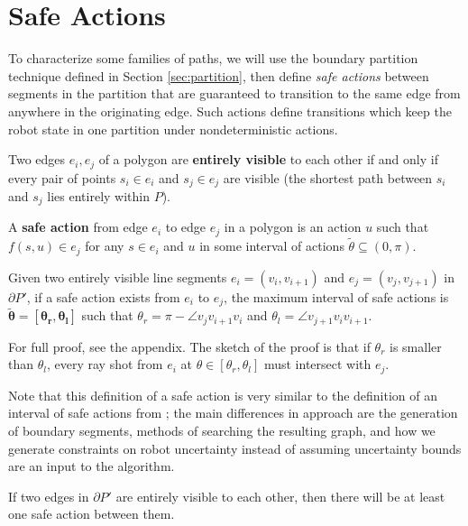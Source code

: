\documentclass[]{styles/svproc}  %
\begin{document}
\section{Safe Actions} \label{sec:safe}

To characterize some families of paths, we will use the boundary
partition technique defined in Section \ref{sec:partition}, then define
\emph{safe actions} between segments in the partition that are
guaranteed to transition to the same edge from anywhere in the
originating edge. Such actions define transitions which keep the
robot state in one partition under nondeterministic actions.

\begin{definition}
Two edges $e_i,e_j$ of a polygon are \textbf{entirely visible} to each other if
and only if every pair of points $s_i \in e_i$ and $s_j \in e_j$ are visible (the
shortest path between $s_i$ and $s_j$ lies entirely within $P$).
\end{definition}

\begin{definition} \label{def:sa}
A \textbf{safe action} from edge $e_i$ to edge $e_j$ in a polygon is an 
action $u$ such
that $f(s,u) \in e_j$ for any $s \in e_i$ and $u$ in some interval of actions
$\tilde{\theta} \subseteq (0,\pi)$.
\end{definition}

\begin{proposition} \label{prop:saferange}
Given two entirely visible line segments $e_i = (v_i, v_{i+1})$ and $e_j =
(v_j, v_{j+1})$ in $\partial P'$, if a safe action
exists from $e_i$ to $e_j$, the maximum interval of safe actions is $\bm{\tilde{\theta} = [\theta_r, \theta_l]}$ such
that $\theta_r = \pi - \angle v_j v_{i+1} v_i$ and $\theta_l = \angle v_{j+1}
v_i v_{i+1}$.
\end{proposition}

For full proof, see the appendix. The sketch of the proof is that if $\theta_r$
is smaller than $\theta_l$, every ray shot from $e_i$ at $\theta \in [\theta_r,
\theta_l]$ must intersect with $e_j$.

Note that this definition of a safe action is very similar to the definition of an interval of
safe actions from \cite{LewOKa13}; the main differences in approach are the
generation of boundary segments, methods of searching the resulting graph, and
how we generate constraints on robot uncertainty instead of assuming uncertainty
bounds are an input to the algorithm.

\begin{lemma}
If two edges in $\partial P'$ are entirely visible to each other, then there will be at least one safe
action between them.
\end{lemma}
\end{document}
